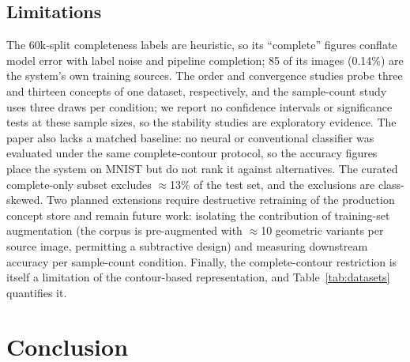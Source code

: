 \documentclass[conference]{IEEEtran}
\begin{document}
\subsection{Limitations}

The 60k-split completeness labels are heuristic, so its ``complete''
figures conflate model error with label noise and pipeline completion;
85 of its images (0.14\%) are the system's own training sources. The
order and convergence studies probe three and thirteen concepts of one
dataset, respectively, and the sample-count study uses three draws per
condition; we report no confidence intervals or significance tests at
these sample sizes, so the stability studies are exploratory evidence.
The paper also lacks a matched baseline: no neural or conventional
classifier was evaluated under the same complete-contour protocol, so the
accuracy figures place the system on MNIST but do not rank it against
alternatives. The curated complete-only subset excludes $\approx$13\% of
the test set, and the exclusions are class-skewed. Two
planned extensions require destructive retraining of the production
concept store and remain future work: isolating the contribution of
training-set augmentation (the corpus is pre-augmented with $\approx$10
geometric variants per source image, permitting a subtractive design) and
measuring downstream accuracy per sample-count condition.
Finally, the complete-contour restriction is itself a limitation of the
contour-based representation, and Table~\ref{tab:datasets} quantifies it.

\section{Conclusion}
\label{sec:conclusion}
\end{document}
